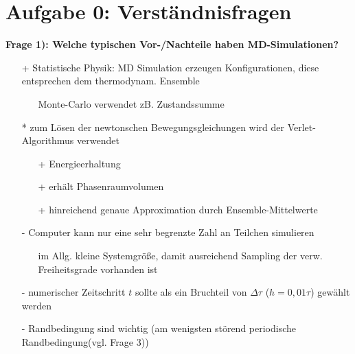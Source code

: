 \section*{Aufgabe 0: Verständnisfragen}

\textbf{Frage 1): Welche typischen Vor-/Nachteile haben MD-Simulationen?}\\
\begin{itemize}
  \item[+] Statistische Physik: MD Simulation erzeugen Konfigurationen, diese entsprechen dem thermodynam. Ensemble
  \begin{itemize}
    \item[] Monte-Carlo verwendet zB. Zustandssumme
  \end{itemize}
  \item[*] zum Lösen der newtonschen Bewegungsgleichungen wird der Verlet-Algorithmus verwendet
  \begin{itemize}
    \item[+] Energieerhaltung
    \item[+] erhält Phasenraumvolumen
    \item[+] hinreichend genaue Approximation durch Ensemble-Mittelwerte
  \end{itemize}
  \item[-] Computer kann nur eine sehr begrenzte Zahl an Teilchen simulieren
  \begin{itemize}
    \item[] im Allg. kleine Systemgröße, damit ausreichend Sampling der verw. Freiheitsgrade vorhanden ist
  \end{itemize}
  \item[-] numerischer Zeitschritt $t$ sollte als ein Bruchteil von $\Delta\tau$ ($h=0,01 \tau$) gewählt werden
  \item[-] Randbedingung sind wichtig (am wenigsten störend periodische Randbedingung(vgl. Frage 3))
\end{itemize}


